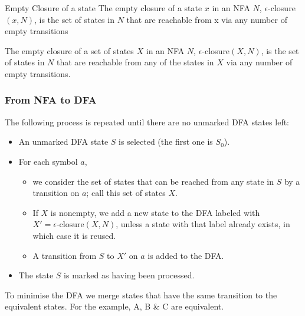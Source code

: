 Empty Closure of a state
The empty closure of a state $x$ in an NFA $N$, $\epsilon$-closure$(x, N)$, is
the set of states in $N$ that are reachable from x via any number
of empty transitions

The empty closure of a set of states $X$ in an NFA $N$, $\epsilon$-closure$(X , N)$, is the set of states in $N$ that are reachable from any of the states in $X$ via any number of empty transitions. 

\subsubsection{From NFA to DFA}

The following process is repeated until there are no unmarked DFA states left:
\begin{itemize}
    \item An unmarked DFA state $S$ is selected (the first one is $S_0$).
    \item For each symbol $a$,
    \begin{itemize}
        \item we consider the set of states that can be reached from any state in $S$ by a transition on $a$; call this set of states $X$.
        \item If $X$ is nonempty, we add a new state to the DFA labeled with $X' = \epsilon\text{-closure}(X, N)$, unless a state with that label already exists, in which case it is reused.
        \item A transition from $S$ to $X'$ on $a$ is added to the DFA.
    \end{itemize}
    \item The state $S$ is marked as having been processed.
\end{itemize}

To minimise the DFA we merge states that have the same
transition to the equivalent states. For the example, A, B \& C
are equivalent.